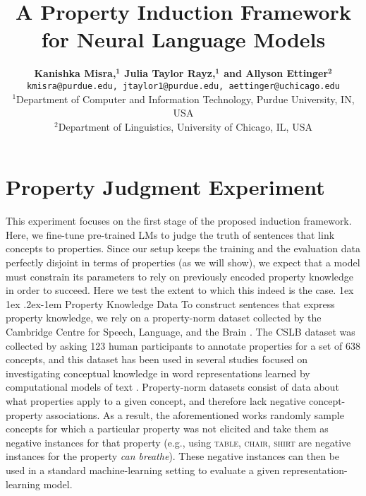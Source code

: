 \documentclass[10pt,letterpaper]{article}
\title{A Property Induction Framework for Neural Language Models}
\author{
{\large \bf Kanishka Misra,$^\textbf{1}$ Julia Taylor Rayz,$^\textbf{1}$ and Allyson Ettinger$^\textbf{2}$}\\
\texttt{kmisra@purdue.edu, jtaylor1@purdue.edu, aettinger@uchicago.edu} \\
  $^1$Department of Computer and Information Technology,
  Purdue University, IN, USA \\
  $^2$Department of Linguistics, University of Chicago, IL, USA
}
\makeatletter
\renewcommand{\paragraph}{%
  \@startsection{paragraph}{4}%
  {\z@}{1ex \@plus 1ex \@minus .2ex}{-1em}%
  {\normalfont\normalsize\bfseries}%
}
\makeatother
\begin{document}
\maketitle



\section{Property Judgment Experiment}
This experiment focuses on the first stage of the proposed induction framework. Here, we fine-tune pre-trained LMs to judge the truth of sentences that link concepts to properties. 
Since our setup keeps the training and the evaluation data perfectly disjoint in terms of properties (as we will show), we expect that a model must constrain its parameters to rely on previously encoded property knowledge in order to succeed. Here we test the extent to which this indeed is the case. 
\paragraph{Property Knowledge Data}
To construct sentences that express property knowledge, we rely on a property-norm dataset collected by the Cambridge Centre for Speech, Language, and the Brain \citep[CSLB;][]{devereux2014centre}.
The CSLB dataset was collected by asking 123 human participants to annotate properties for a set of 638 concepts, and this dataset has been used in several
studies focused on investigating conceptual knowledge in word representations learned by computational models of text \citep[e.g., ][]{lucy-gauthier-2017-distributional, da-kasai-2019-cracking, bhatia2020transformer}.
Property-norm datasets consist of data about what properties apply to a given concept, and therefore lack negative concept-property associations. 
As a result, the aforementioned works \citep{lucy-gauthier-2017-distributional, da-kasai-2019-cracking, bhatia2020transformer} randomly sample concepts for which a particular property was not elicited and take them as negative instances for that property (e.g., using \textsc{table, chair, shirt} are negative instances for the property \textit{can breathe}). These negative instances can then be used in a standard machine-learning setting to evaluate a given representation-learning model.
\end{document}
